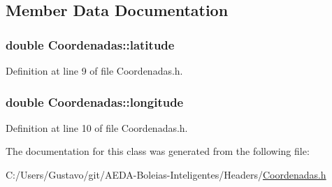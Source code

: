 \subsection{Member Data Documentation}
\hypertarget{class_coordenadas_ad7aa0271fc0ca8c8da179f9cfe859bf0}{
\subsubsection[{latitude}]{\setlength{\rightskip}{0pt plus 5cm}double Coordenadas\+::latitude\hspace{0.3cm}{\ttfamily [private]}}}\label{class_coordenadas_ad7aa0271fc0ca8c8da179f9cfe859bf0}


Definition at line 9 of file Coordenadas.\+h.

\hypertarget{class_coordenadas_a328c0d572b3a7d47bfbd866f5d6d6489}{
\subsubsection[{longitude}]{\setlength{\rightskip}{0pt plus 5cm}double Coordenadas\+::longitude\hspace{0.3cm}{\ttfamily [private]}}}\label{class_coordenadas_a328c0d572b3a7d47bfbd866f5d6d6489}


Definition at line 10 of file Coordenadas.\+h.



The documentation for this class was generated from the following file\+:\begin{DoxyCompactItemize}
\item 
C\+:/\+Users/\+Gustavo/git/\+A\+E\+D\+A-\/\+Boleias-\/\+Inteligentes/\+Headers/\hyperlink{_coordenadas_8h}{Coordenadas.\+h}\end{DoxyCompactItemize}
